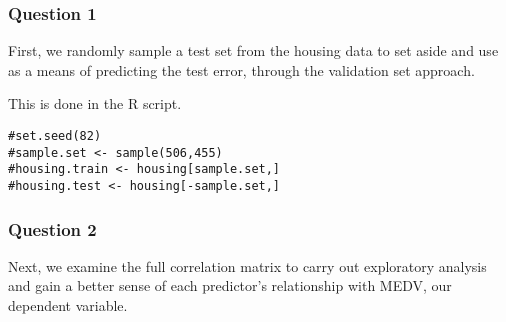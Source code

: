 \documentclass[]{article}
\author{}
\date{}
\begin{document}
\subsubsection{Question 1}\label{question-1}

First, we randomly sample a test set from the housing data to set aside
and use as a means of predicting the test error, through the validation
set approach.

This is done in the R script.

\begin{verbatim}
#set.seed(82)
#sample.set <- sample(506,455)
#housing.train <- housing[sample.set,]
#housing.test <- housing[-sample.set,]
\end{verbatim}

\subsubsection{Question 2}\label{question-2}

Next, we examine the full correlation matrix to carry out exploratory
analysis and gain a better sense of each predictor's relationship with
MEDV, our dependent variable.
\end{document}
